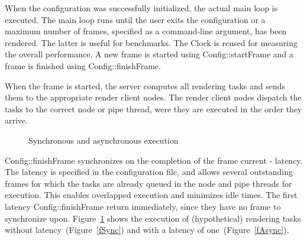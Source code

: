 \documentclass[10pt,a4]{scrartcl}
\newcommand{\fig}[1]{Figure~\ref{#1}}
\begin{document}
When the configuration was successfully initialized, the actual main
loop is executed. The main loop runs until the user exits the
configuration or a maximum number of frames, specified as a command-line
argument, has been rendered. The latter is useful for benchmarks. The
\textsf{Clock} is reused for measuring the overall performance. A new
frame is started using \textsf{Config::startFrame} and a frame is
finished using \textsf{Config::finishFrame}.

When the frame is started, the server computes all rendering tasks and
sends them to the appropriate render client nodes. The render client
nodes dispatch the tasks to the correct node or pipe thread, were they
are executed in the order they arrive.

\begin{figure}
  \hfil
  {\caption{\small\label{fSyncAsync}Synchronous and asynchronous execution}}
\end{figure}
\textsf{Config::finishFrame} synchronizes on the completion of the frame
\textsf{current - latency}. The latency is specified in the
configuration file, and allows several outstanding frames for which the
tasks are already queued in the node and pipe threads for
execution. This enables overlapped execution and minimizes idle
times. The first \textsf{latency Config::finishFrame} return
immediately, since they have no frame to synchronize
upon. \fig{fSyncAsync} shows the execution of (hypothetical)
rendering tasks without latency~(\fig{fSync}) and with a latency of
one~(\fig{fAsync}).
\end{document}
